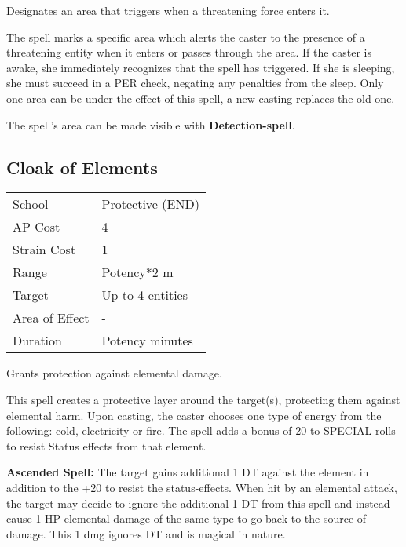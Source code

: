 \documentclass[11pt,a4paper,twocolumn]{book}
\begin{document}
\medskip

Designates an area that triggers when a threatening force enters it.

The spell marks a specific area which alerts the caster to the presence of a threatening entity when it enters or passes through the area. If the caster is awake, she immediately recognizes that the spell has triggered. If she is sleeping, she must succeed in a PER check, negating any penalties from the sleep. Only one area can be under the effect of this spell, a new casting replaces the old one.

The spell's area can be made visible with \textbf{Detection-spell}.


\subsection*{Cloak of Elements}
{
	\begin{tabu} to 75mm{| X[l,4] | X[l,7] |}
		\hline
		School 			& Protective (END) 		\\
		AP Cost	      	& 4 					\\
		Strain Cost     & 1 					\\
		Range     		& Potency*2 m			\\
		Target      	& Up to 4 entities 		\\
		Area of Effect  & - 	 				\\
		Duration     	& Potency minutes 		\\ \hline
	\end{tabu}
	
}

\medskip

Grants protection against elemental damage.

This spell creates a protective layer around the target(s), protecting them against elemental harm. Upon casting, the caster chooses one type of energy from the following: cold, electricity or fire. The spell adds a bonus of 20 to SPECIAL rolls to resist Status effects from that element.

\textbf{Ascended Spell:} The target gains additional 1 DT against the element in addition to the +20 to resist the status-effects. When hit by an elemental attack, the target may decide to ignore the additional 1 DT from this spell and instead cause 1 HP elemental damage of the same type to go back to the source of damage. This 1 dmg ignores DT and is magical in nature.
\end{document}
